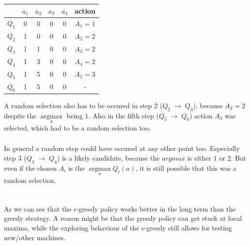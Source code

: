 \documentclass[11pt,a4paper]{article}
\begin{document}
\begin{center}
\begin{tabular}{c |c c c c | c} 
    & $a_{1}$ & $a_{2}$ & $a_{3}$ & $a_{4}$ & action \\ [0.5ex] 
    \hline
    $Q_{1}$ & 0 & 0 & 0 & 0 & $A_{1}=1$ \\
    \hline
    $Q_{2}$ & 1 & 0 & 0 & 0 & $A_{2}=2$ \\ 
    \hline
    $Q_{3}$ & 1 & 1 & 0 & 0 & $A_{3}=2$ \\
    \hline
    $Q_{4}$ & 1 & 3 & 0 & 0 & $A_{4}=2$ \\
    \hline
    $Q_{5}$ & 1 & 5 & 0 & 0 & $A_{5}=3$ \\
    \hline
    $Q_{6}$ & 1 & 5 & 0 & 0 & - \\
    \hline
\end{tabular}
\end{center}

\flushleft A random selection also has to be occured in step 2 ($Q_{2} \; \rightarrow \; Q_{3}$), because $A_{2}=2$ despite the 
$\underset{a}{\operatorname{argmax}}$
being $1$. Also in the fifth step ($Q_{5} \; \rightarrow \; Q_{6}$) action $A_{3}$ was selected, 
which had to be a random selection too.


\subsubsection{}

In general a random step could have occured at any other point too. 
Especially step 3 ($Q_{3} \; \rightarrow \; Q_{4}$) is a likely candidate, because the $argmax$ is either $1$ or $2$.
But even if the chosen $A_{i}$ is the $\underset{a}{\operatorname{argmax}}Q_{t}(a)$, it is still possible that this was a random selection. 


\section{}

\subsection{}

As we can see that the $\epsilon$-greedy policy works better in the long term than the greedy strategy.
A reason might be that the greedy policy can get stuck at local maxima, while the exploring behaviour
of the $\epsilon$-greedy still allows for testing new/other machines.
\end{document}
